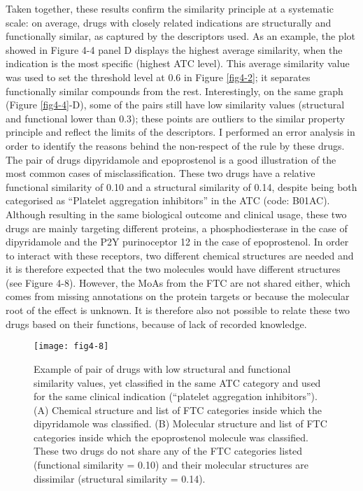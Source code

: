 Taken together, these results confirm the similarity principle at a systematic scale: on average, drugs with closely related indications are structurally and functionally similar, as captured by the descriptors used. As an example, the plot showed in Figure 4-4 panel D displays the highest average similarity, when the indication is the most specific (highest ATC level). This average similarity value was used to set the threshold level at 0.6 in Figure \ref{fig4-2}; it separates functionally similar compounds from the rest. Interestingly, on the same graph (Figure \ref{fig4-4}-D), some of the pairs still have low similarity values (structural and functional lower than 0.3); these points are outliers to the similar property principle and reflect the limits of the descriptors. I performed an error analysis in order to identify the reasons behind the non-respect of the rule by these drugs. The pair of drugs dipyridamole and epoprostenol is a good illustration of the most common cases of misclassification. These two drugs have a relative functional similarity of 0.10 and a structural similarity of 0.14, despite being both categorised as “Platelet aggregation inhibitors” in the ATC (code: B01AC). Although resulting in the same biological outcome and clinical usage, these two drugs are mainly targeting different proteins, a phosphodiesterase in the case of dipyridamole and the P2Y purinoceptor 12 in the case of epoprostenol. In order to interact with these receptors, two different chemical structures are needed and it is therefore expected that the two molecules would have different structures (see Figure 4-8). However, the MoAs from the FTC are not shared either, which comes from missing annotations on the protein targets or because the molecular root of the effect is unknown. It is therefore also not possible to relate these two drugs based on their functions, because of lack of recorded knowledge.

\begin{figure}[H]
    \centering
    \texttt{[image: fig4-8]}
    \caption{Example of pair of drugs with low structural and functional similarity values, yet classified in the same ATC category and used for the same clinical indication (“platelet aggregation inhibitors”). (A) Chemical structure and list of FTC categories inside which the dipyridamole was classified. (B) Molecular structure and list of FTC categories inside which the epoprostenol molecule was classified. These two drugs do not share any of the FTC categories listed (functional similarity = 0.10) and their molecular structures are dissimilar (structural similarity = 0.14).}
    \label{fig4-8}
\end{figure}

